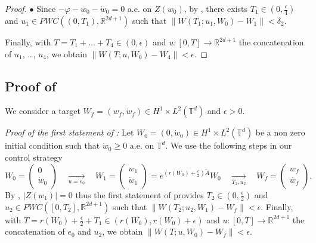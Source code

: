 \documentclass[a4paper]{article}
\theoremstyle{plain}
\newcommand{\T}{\mathbb{T}}
\newcommand{\R}{\mathbb{R}}
\begin{document}
\begin{proof}
\medskip 

\noindent $\bullet$ Since $-\varphi-w_0-\dot{w}_0=0$ a.e. on $Z(w_0)$, by , there exists $T_1 \in (0,\frac{\epsilon}{4})$ and $u_1 \in PWC((0,T_1),\R^{2d+1})$ such that 
$\| W(T_1;u_1,W_0)-W_1\|<\delta_2$. 

\medskip

Finally, with $T=T_1+\dots+T_4 \in (0,\epsilon)$ and $u:[0,T] \to \R^{2d+1}$ the concatenation of $u_1$, \dots, $u_4$, we obtain $\|W(T;u,W_0)-W_4\|<\epsilon$.
\end{proof}




\subsection{Proof of }
\label{subsec:proofTmin}


We consider a target $W_f=(w_f,\dot{w}_f) \in H^1 \times L^2(\T^d)$ and $\epsilon>0$.

\bigskip

\noindent \emph{Proof of the first statement of :}
Let $W_0=(0,\dot{w}_0) \in H^1 \times L^2(\T^d)$ be a non zero initial condition such that $\dot{w}_0 \geq 0$ a.e. on  $\T^d$. We use the following steps in our control strategy
$$W_0=\begin{pmatrix}
    0 \\ \dot{w}_0
\end{pmatrix}
\quad \xrightarrow[u=e_0]{} \quad
W_1=\begin{pmatrix}
    w_1 \\ \dot{w}_1
\end{pmatrix}=e^{(r(W_0)+\frac{\epsilon}{2}) \widetilde{A}}W_0
\quad \xrightarrow[T_2,u_2]{} \quad
W_f=\begin{pmatrix}
    w_f \\ \dot{w_f}
\end{pmatrix}.$$
By , $|Z(w_1)|=0$ thus the first statement of  provides $T_2 \in (0,\frac{\epsilon}{2})$ and $u_2 \in PWC([0,T_2],\R^{2d+1})$ such that $\|W(T_2;u_2,W_1)-W_f\|<\epsilon$. Finally, with $T=r(W_0)+\frac{\epsilon}{2}+T_1 \in (r(W_0),r(W_0)+\epsilon)$ and $u:[0,T] \to \R^{2d+1}$ the concatenation of $e_0$ and $u_2$, we obtain $\|W(T;u,W_0)-W_f\|<\epsilon$.

\bigskip
\end{document}
